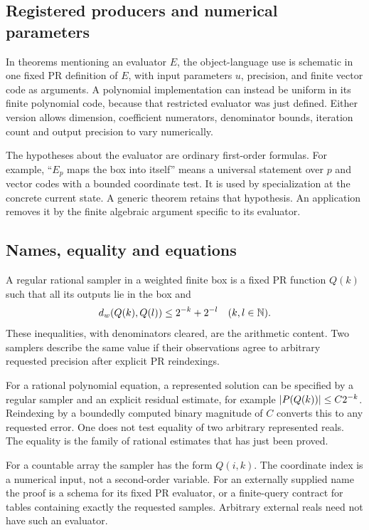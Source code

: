 \subsection{Registered producers and numerical parameters}

In theorems mentioning an evaluator \(E\), the object-language use is
schematic in one fixed PR definition of \(E\), with input parameters
\(u\), precision, and finite vector code as arguments. A polynomial
implementation can instead be uniform in its finite polynomial code,
because that restricted evaluator was just defined. Either version
allows dimension, coefficient numerators, denominator bounds, iteration
count and output precision to vary numerically.

The hypotheses about the evaluator are ordinary first-order formulas.
For example, ``\(E_p\) maps the box into itself'' means a universal
statement over \(p\) and vector codes with a bounded coordinate test.
It is used by specialization at the concrete current state. A generic
theorem retains that hypothesis. An application removes it by the
finite algebraic argument specific to its evaluator.

\subsection{Names, equality and equations}

\begin{definition}
A regular rational sampler in a weighted finite box is a fixed PR
function \(Q(k)\) such that all its outputs lie in the box and
\[
 d_w(Q(k),Q(l))\le2^{-k}+2^{-l}\quad(k,l\in\mathbb N).
\]
These inequalities, with denominators cleared, are the arithmetic
content. Two samplers describe the same value if their observations
agree to arbitrary requested precision after explicit PR reindexings.
\end{definition}

For a rational polynomial equation, a represented solution can be
specified by a regular sampler and an explicit residual estimate, for
example \(\left|P(Q(k))\right|\le C2^{-k}\). Reindexing by a boundedly computed
binary magnitude of \(C\) converts this to any requested error. One
does not test equality of two arbitrary represented reals. The equality
is the family of rational estimates that has just been proved.

For a countable array the sampler has the form \(Q(i,k)\). The coordinate
index is a numerical input, not a second-order variable. For an externally
supplied name the proof is a schema for its fixed PR evaluator, or a
finite-query contract for tables containing exactly the requested
samples. Arbitrary external reals need not have such an evaluator.

